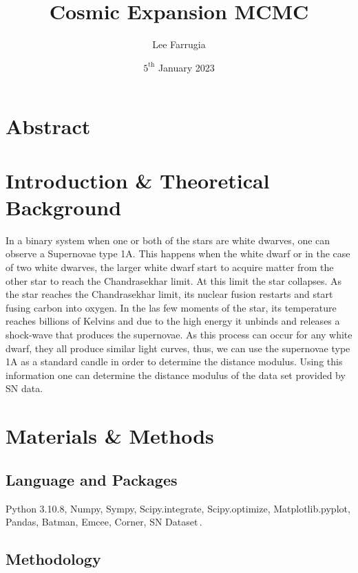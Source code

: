 \documentclass[12pt, a4paper]{article}
\title{Cosmic Expansion MCMC}
\date{\(5^\mathrm{{th}}\) January 2023}
\author{Lee Farrugia}
\begin{document}
    
\maketitle
\thispagestyle{titlepagestyle}
\pagestyle{mystyle}

\section{Abstract}


\section{Introduction \& Theoretical Background}

In a binary system when one or both of the stars are white dwarves, one can observe a Supernovae type 1A. This happens when the white dwarf or in the case of two white dwarves, the larger white dwarf start to acquire matter from the other star to reach the Chandrasekhar limit. At this limit the star collapses. As the star reaches the Chandrasekhar limit, its nuclear fusion restarts and start fusing carbon into oxygen. In the las few moments of the star, its temperature reaches billions of Kelvins and due to the high energy it unbinds and releases a shock-wave that produces the supernovae. As this process can occur for any white dwarf, they all produce similar light curves, thus, we can use the supernovae type 1A as a standard candle in order to determine the distance modulus. Using this information one can determine the distance modulus of the data set provided by SN data.

\section{Materials \& Methods}
    \subsection{Language and Packages}

        Python 3.10.8, Numpy, Sympy, Scipy.integrate, Scipy.optimize, Matplotlib.pyplot, Pandas, Batman, Emcee, Corner, SN Dataset\,.

    \subsection{Methodology}
\end{document}
